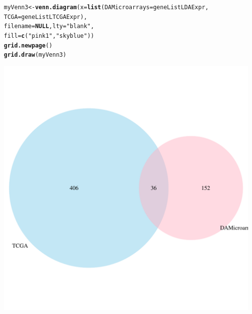 \documentclass[a4paper,10pt]{article}\usepackage[]{graphicx}\usepackage[]{color}
\makeatletter
\def\maxwidth{ %
  \ifdim\Gin@nat@width>\linewidth
    \linewidth
  \else
    \Gin@nat@width
  \fi
}
\newcommand{\hlstr}[1]{\textcolor[rgb]{0.192,0.494,0.8}{#1}}%
\newcommand{\hlstd}[1]{\textcolor[rgb]{0.345,0.345,0.345}{#1}}%
\newcommand{\hlkwa}[1]{\textcolor[rgb]{0.161,0.373,0.58}{\textbf{#1}}}%
\newcommand{\hlkwb}[1]{\textcolor[rgb]{0.69,0.353,0.396}{#1}}%
\newcommand{\hlkwc}[1]{\textcolor[rgb]{0.333,0.667,0.333}{#1}}%
\newcommand{\hlkwd}[1]{\textcolor[rgb]{0.737,0.353,0.396}{\textbf{#1}}}%
\newenvironment{kframe}{%
 \def\at@end@of@kframe{}%
 \ifinner\ifhmode%
  \def\at@end@of@kframe{\end{minipage}}%
  \begin{minipage}{\columnwidth}%
 \fi\fi%
 \def\FrameCommand##1{\hskip\@totalleftmargin \hskip-\fboxsep
 \colorbox{shadecolor}{##1}\hskip-\fboxsep
     \hskip-\linewidth \hskip-\@totalleftmargin \hskip\columnwidth}%
 \MakeFramed {\advance\hsize-\width
   \@totalleftmargin\z@ \linewidth\hsize
   \@setminipage}}%
 {\par\unskip\endMakeFramed%
 \at@end@of@kframe}
\newenvironment{knitrout}{}{} %
\makeatother
\begin{document}
\begin{knitrout}
\begin{kframe}
\begin{alltt}
\hlstd{myVenn3}\hlkwb{<-} \hlkwd{venn.diagram}\hlstd{(}\hlkwc{x}\hlstd{=}\hlkwd{list}\hlstd{(}\hlkwc{DAMicroarrays}\hlstd{=geneListLDAExpr,}
                              \hlkwc{TCGA}\hlstd{=geneListLTCGAExpr),}
                              \hlkwc{filename}\hlstd{=}\hlkwa{NULL}\hlstd{,} \hlkwc{lty} \hlstd{=} \hlstr{"blank"}\hlstd{,}
                              \hlkwc{fill}\hlstd{=}\hlkwd{c}\hlstd{(}\hlstr{"pink1"}\hlstd{,} \hlstr{"skyblue"}\hlstd{))}
\hlkwd{grid.newpage}\hlstd{()}
\hlkwd{grid.draw}\hlstd{(myVenn3)}
\end{alltt}
\end{kframe}
\includegraphics[width=\maxwidth]{figure/selectLGenes1-2} 

\end{knitrout}
\end{document}
